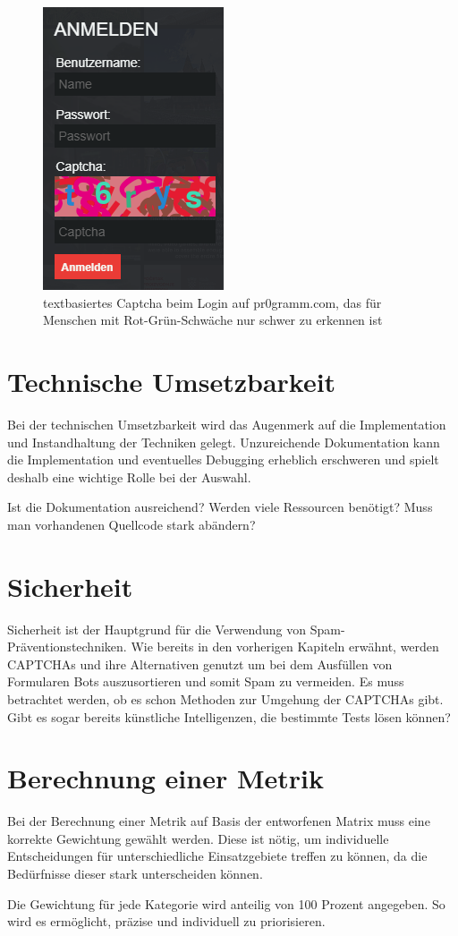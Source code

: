 \begin{figure}
    \centering
    \includegraphics{gfx/mygraphics/pr0grammcaptcha.png}
    \caption{textbasiertes Captcha beim Login auf pr0gramm.com, das für Menschen mit Rot-Grün-Schwäche nur schwer zu erkennen ist}
    \label{fig:pr0grammcaptcha}
\end{figure}

\section{Technische Umsetzbarkeit}
\label{ch:matrix:tu}

Bei der technischen Umsetzbarkeit wird das Augenmerk auf die Implementation und Instandhaltung der Techniken gelegt. 
Unzureichende Dokumentation kann die Implementation und eventuelles Debugging erheblich erschweren 
und spielt deshalb eine wichtige Rolle bei der Auswahl. 

Ist die Dokumentation ausreichend? Werden viele Ressourcen benötigt? Muss man vorhandenen Quellcode stark abändern?

\section{Sicherheit}
\label{ch:matrix:sicherheit}
Sicherheit ist der Hauptgrund für die Verwendung von Spam-Präventionstechniken. 
Wie bereits in den vorherigen Kapiteln erwähnt, werden CAPTCHAs und ihre Alternativen genutzt um bei dem Ausfüllen von Formularen Bots auszusortieren
und somit Spam zu vermeiden.
Es muss betrachtet werden, ob es schon Methoden zur Umgehung der CAPTCHAs gibt. 
Gibt es sogar bereits künstliche Intelligenzen, die bestimmte Tests lösen können?

\section{Berechnung einer Metrik}
\label{ch:matrix:berechnung}
Bei der Berechnung einer Metrik auf Basis der entworfenen Matrix muss eine korrekte Gewichtung gewählt werden. 
Diese ist nötig, um individuelle Entscheidungen für unterschiedliche Einsatzgebiete treffen zu können,
da die Bedürfnisse dieser stark unterscheiden können. 

Die Gewichtung für jede Kategorie wird anteilig von 100 Prozent angegeben.
So wird es ermöglicht, präzise und individuell zu priorisieren.



